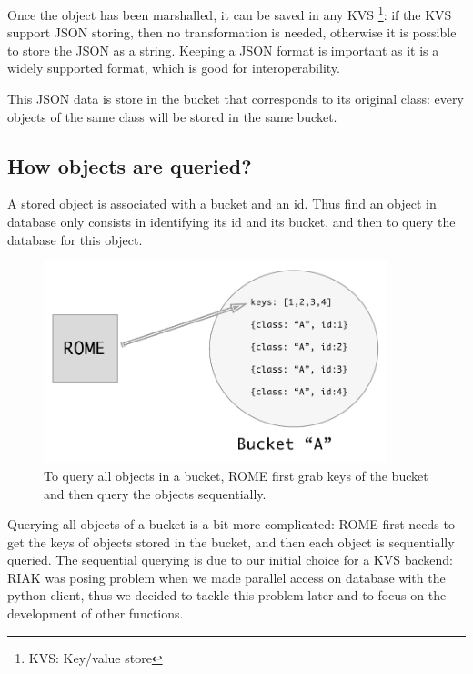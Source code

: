 Once the object has been marshalled, it can be saved in any KVS \footnote{KVS: Key/value store}: if the KVS support JSON storing, then no transformation is needed,
otherwise it is possible to store the JSON as a string. Keeping a JSON format is
important as it is a widely supported format, which is good for
interoperability.

This JSON data is store in the bucket that corresponds to its original class:
every objects of the same class will be stored in the same bucket.

\subsection{How objects are queried?}

A stored object is associated with a bucket and an id. Thus find an object in
database only consists in identifying its id and its bucket, and then to query
the database for this object.

\begin{figure}[h!]
        \centering
        \includegraphics[width=10cm]{figures/rome_query_all.pdf}
        \caption{To query all objects in a bucket, ROME first grab keys of the
        bucket and then query the objects sequentially.}
      \label{fig:rome_marshalling}
\vspace*{-.3cm}
\end{figure}

Querying all objects of a bucket is a bit more complicated: ROME first needs
to get the keys of objects stored in the bucket, and then each object is
sequentially queried. The sequential querying is due to our initial choice for
a KVS backend: RIAK was posing problem when we made parallel access on database
with the python client, thus we decided to tackle this problem later and to
focus on the development of other functions.

